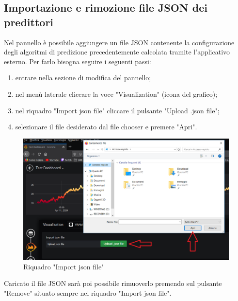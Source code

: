     \subsection{Importazione e rimozione file JSON dei predittori}
        Nel pannello è possibile aggiungere un file JSON contenente la configurazione degli algoritmi di predizione precedentemente calcolata tramite l'applicativo esterno. Per farlo bisogna seguire i seguenti passi:
        \begin{enumerate}
            \item entrare nella sezione di modifica del pannello;
            \item nel menù laterale cliccare la voce "Visualization" (icona del grafico);
            \item nel riquadro "Import json file" cliccare il pulsante "Upload .json file";
            \item selezionare il file desiderato dal file chooser e premere "Apri".
        \end{enumerate}
        \begin{figure}[H]
            \includegraphics[width=\textwidth,height=\textheight,keepaspectratio]{img/importazione_e_rimozione_JSON.png}
            \caption{Riquadro "Import json file"}
        \end{figure}
        Caricato il file JSON sarà poi possibile rimuoverlo premendo sul pulsante "Remove" situato sempre nel riquadro "Import json file".
